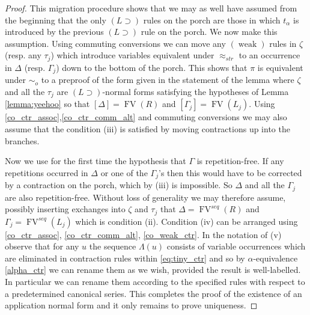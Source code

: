 \documentclass[english,letter paper,12pt,leqno]{article}
\theoremstyle{example}
\numberwithin{equation}{section}
\def\imp{\supset}
\begin{document}
\begin{proof}
This migration procedure shows that we may as well have assumed from the beginning that the only $(L \imp)$ rules on the porch are those in which $t_\alpha$ is introduced by the previous $(L \imp)$ rule on the porch. We now make this assumption. Using commuting conversions we can move any $(\operatorname{weak})$ rules in $\zeta$ (resp. any $\tau_j$) which introduce variables equivalent under $\approx_{str}$ to an occurrence in $\Delta$ (resp. $\Gamma_j$) down to the bottom of the porch. This shows that $\pi$ is equivalent under $\sim_o$ to a preproof of the form given in the statement of the lemma where $\zeta$ and all the $\tau_j$ are $(L \imp)$-normal forms satisfying the hypotheses of Lemma \ref{lemma:yeehoo} so that $[ \Delta ] = \operatorname{FV}(R)$ and $[ \Gamma_j ] = \operatorname{FV}(L_j)$. Using \eqref{co_ctr_assoc},\eqref{co_ctr_comm_alt} and commuting conversions we may also assume that the condition (iii) is satisfied by moving contractions up into the branches.

Now we use for the first time the hypothesis that $\Gamma$ is repetition-free. If any repetitions occurred in $\Delta$ or one of the $\Gamma_j$'s then this would have to be corrected by a contraction on the porch, which by (iii) is impossible. So $\Delta$ and all the $\Gamma_j$ are also repetition-free. Without loss of generality we may therefore assume, possibly inserting exchanges into $\zeta$ and $\tau_j$ that $\Delta = \operatorname{FV}^{seq}(R)$ and $\Gamma_j = \operatorname{FV}^{seq}(L_j)$ which is condition (ii). Condition (iv) can be arranged using \eqref{co_ctr_assoc}, \eqref{co_ctr_comm_alt}, \eqref{co_weak_ctr}. In the notation of (v) observe that for any $u$ the sequence $\Lambda(u)$ consists of variable occurrences which are eliminated in contraction rules within \eqref{eq:tiny_ctr} and so by $\alpha$-equivalence \eqref{alpha_ctr} we can rename them as we wish, provided the result is well-labelled. In particular we can rename them according to the specified rules with respect to a predetermined canonical series. This completes the proof of the existence of an application normal form and it only remains to prove uniqueness. 


\end{proof}
\end{document}
